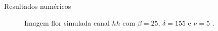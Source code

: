 \documentclass[10pt]{beamer}
\begin{document}
\begin{frame}{Resultados numéricos}
\begin{figure}[hbt]
	\caption{Imagem flor simulada canal $hh$ com $\beta = 25$, $\delta = 155$ e $\nu = 5$ .}
\label{cap_acf_fig15}
\endminipage\hfill
{}

\end{figure}
\end{frame}
\end{document}
